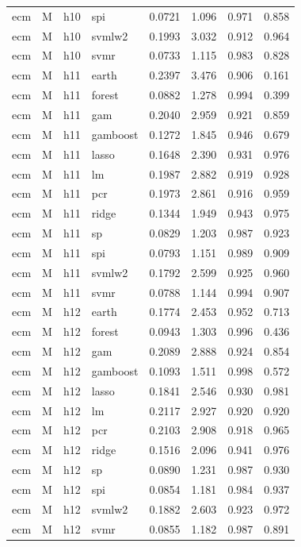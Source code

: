 \begin{ThreePartTable}
\begin{longtable}[t]{llclcccc}
ecm & M & h10 & spi & 0.0721 & 1.096 & 0.971 & 0.858\\
ecm & M & h10 & svmlw2 & 0.1993 & 3.032 & 0.912 & 0.964\\
ecm & M & h10 & svmr & 0.0733 & 1.115 & 0.983 & 0.828\\
\addlinespace
ecm & M & h11 & earth & 0.2397 & 3.476 & 0.906 & 0.161\\
ecm & M & h11 & forest & 0.0882 & 1.278 & 0.994 & 0.399\\
ecm & M & h11 & gam & 0.2040 & 2.959 & 0.921 & 0.859\\
ecm & M & h11 & gamboost & 0.1272 & 1.845 & 0.946 & 0.679\\
ecm & M & h11 & lasso & 0.1648 & 2.390 & 0.931 & 0.976\\
ecm & M & h11 & lm & 0.1987 & 2.882 & 0.919 & 0.928\\
ecm & M & h11 & pcr & 0.1973 & 2.861 & 0.916 & 0.959\\
ecm & M & h11 & ridge & 0.1344 & 1.949 & 0.943 & 0.975\\
ecm & M & h11 & sp & 0.0829 & 1.203 & 0.987 & 0.923\\
ecm & M & h11 & spi & 0.0793 & 1.151 & 0.989 & 0.909\\
ecm & M & h11 & svmlw2 & 0.1792 & 2.599 & 0.925 & 0.960\\
ecm & M & h11 & svmr & 0.0788 & 1.144 & 0.994 & 0.907\\
\addlinespace
ecm & M & h12 & earth & 0.1774 & 2.453 & 0.952 & 0.713\\
ecm & M & h12 & forest & 0.0943 & 1.303 & 0.996 & 0.436\\
ecm & M & h12 & gam & 0.2089 & 2.888 & 0.924 & 0.854\\
ecm & M & h12 & gamboost & 0.1093 & 1.511 & 0.998 & 0.572\\
ecm & M & h12 & lasso & 0.1841 & 2.546 & 0.930 & 0.981\\
ecm & M & h12 & lm & 0.2117 & 2.927 & 0.920 & 0.920\\
ecm & M & h12 & pcr & 0.2103 & 2.908 & 0.918 & 0.965\\
ecm & M & h12 & ridge & 0.1516 & 2.096 & 0.941 & 0.976\\
ecm & M & h12 & sp & 0.0890 & 1.231 & 0.987 & 0.930\\
ecm & M & h12 & spi & 0.0854 & 1.181 & 0.984 & 0.937\\
ecm & M & h12 & svmlw2 & 0.1882 & 2.603 & 0.923 & 0.972\\
ecm & M & h12 & svmr & 0.0855 & 1.182 & 0.987 & 0.891\\

\end{longtable}
\end{ThreePartTable}
